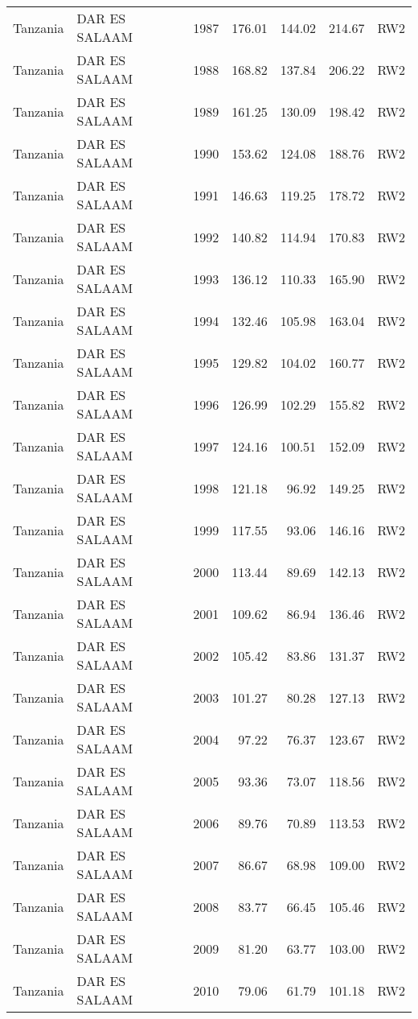\begin{longtable}{lllrrrl}
  Tanzania & DAR ES SALAAM & 1987 & 176.01 & 144.02 & 214.67 & RW2 \\ 
  Tanzania & DAR ES SALAAM & 1988 & 168.82 & 137.84 & 206.22 & RW2 \\ 
  Tanzania & DAR ES SALAAM & 1989 & 161.25 & 130.09 & 198.42 & RW2 \\ 
  Tanzania & DAR ES SALAAM & 1990 & 153.62 & 124.08 & 188.76 & RW2 \\ 
  Tanzania & DAR ES SALAAM & 1991 & 146.63 & 119.25 & 178.72 & RW2 \\ 
  Tanzania & DAR ES SALAAM & 1992 & 140.82 & 114.94 & 170.83 & RW2 \\ 
  Tanzania & DAR ES SALAAM & 1993 & 136.12 & 110.33 & 165.90 & RW2 \\ 
  Tanzania & DAR ES SALAAM & 1994 & 132.46 & 105.98 & 163.04 & RW2 \\ 
  Tanzania & DAR ES SALAAM & 1995 & 129.82 & 104.02 & 160.77 & RW2 \\ 
  Tanzania & DAR ES SALAAM & 1996 & 126.99 & 102.29 & 155.82 & RW2 \\ 
  Tanzania & DAR ES SALAAM & 1997 & 124.16 & 100.51 & 152.09 & RW2 \\ 
  Tanzania & DAR ES SALAAM & 1998 & 121.18 & 96.92 & 149.25 & RW2 \\ 
  Tanzania & DAR ES SALAAM & 1999 & 117.55 & 93.06 & 146.16 & RW2 \\ 
  Tanzania & DAR ES SALAAM & 2000 & 113.44 & 89.69 & 142.13 & RW2 \\ 
  Tanzania & DAR ES SALAAM & 2001 & 109.62 & 86.94 & 136.46 & RW2 \\ 
  Tanzania & DAR ES SALAAM & 2002 & 105.42 & 83.86 & 131.37 & RW2 \\ 
  Tanzania & DAR ES SALAAM & 2003 & 101.27 & 80.28 & 127.13 & RW2 \\ 
  Tanzania & DAR ES SALAAM & 2004 & 97.22 & 76.37 & 123.67 & RW2 \\ 
  Tanzania & DAR ES SALAAM & 2005 & 93.36 & 73.07 & 118.56 & RW2 \\ 
  Tanzania & DAR ES SALAAM & 2006 & 89.76 & 70.89 & 113.53 & RW2 \\ 
  Tanzania & DAR ES SALAAM & 2007 & 86.67 & 68.98 & 109.00 & RW2 \\ 
  Tanzania & DAR ES SALAAM & 2008 & 83.77 & 66.45 & 105.46 & RW2 \\ 
  Tanzania & DAR ES SALAAM & 2009 & 81.20 & 63.77 & 103.00 & RW2 \\ 
  Tanzania & DAR ES SALAAM & 2010 & 79.06 & 61.79 & 101.18 & RW2 \\ 

\end{longtable}
